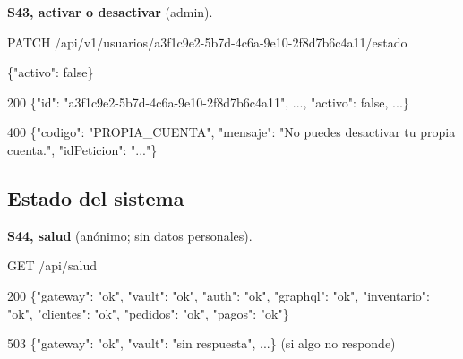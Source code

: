 \textbf{S43, activar o desactivar} (admin).


\begin{codigo}
PATCH /\allowbreak{}api/\allowbreak{}v1/\allowbreak{}usuarios/\allowbreak{}a3f1c9e2-\allowbreak{}5b7d-\allowbreak{}4c6a-\allowbreak{}9e10-\allowbreak{}2f8d7b6c4a11/\allowbreak{}estado\par
\{"activo":\allowbreak{} false\}\par
\end{codigo}

\begin{codigo}
200 \{"id":\allowbreak{} "a3f1c9e2-\allowbreak{}5b7d-\allowbreak{}4c6a-\allowbreak{}9e10-\allowbreak{}2f8d7b6c4a11",\allowbreak{} .\allowbreak{}.\allowbreak{}.\allowbreak{},\allowbreak{} "activo":\allowbreak{} false,\allowbreak{} .\allowbreak{}.\allowbreak{}.\allowbreak{}\}\par
400 \{"codigo":\allowbreak{} "PROPIA\_\allowbreak{}CUENTA",\allowbreak{} "mensaje":\allowbreak{} "No puedes desactivar tu propia cuenta.\allowbreak{}",\allowbreak{} "idPeticion":\allowbreak{} ".\allowbreak{}.\allowbreak{}.\allowbreak{}"\}\par
\end{codigo}

\subsection{Estado del sistema}

\textbf{S44, salud} (anónimo; sin datos personales).


\begin{codigo}
GET /\allowbreak{}api/\allowbreak{}salud\par
\end{codigo}

\begin{codigo}
200 \{"gateway":\allowbreak{} "ok",\allowbreak{} "vault":\allowbreak{} "ok",\allowbreak{} "auth":\allowbreak{} "ok",\allowbreak{} "graphql":\allowbreak{} "ok",\allowbreak{} "inventario":\allowbreak{} "ok",\allowbreak{} "clientes":\allowbreak{} "ok",\allowbreak{} "pedidos":\allowbreak{} "ok",\allowbreak{} "pagos":\allowbreak{} "ok"\}\par
503 \{"gateway":\allowbreak{} "ok",\allowbreak{} "vault":\allowbreak{} "sin respuesta",\allowbreak{} .\allowbreak{}.\allowbreak{}.\allowbreak{}\}   (\allowbreak{}si algo no responde)\par
\end{codigo}
